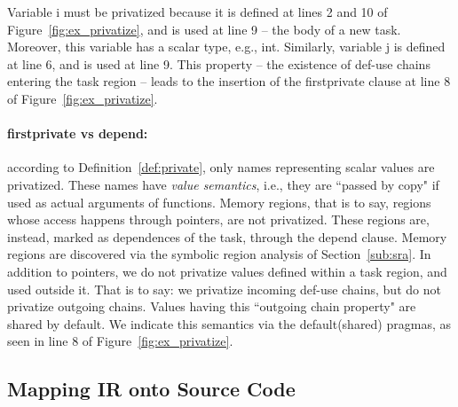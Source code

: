 \documentclass[sigplan,10pt,screen]{acmart}
\begin{document}
\begin{example}
\label{ex:priv_2}
Variable \textsf{i} must be privatized because it is defined at lines 2 and 10 of
Figure~\ref{fig:ex_privatize}, and is used at line 9 -- the body of a new task.
Moreover, this variable has a scalar type, e.g., \textsf{int}.
Similarly, variable \textsf{j} is defined at line 6, and is used at line 9.
This property -- the existence of def-use chains entering the task region --
leads to the insertion of the \textsf{firstprivate} clause at line 8 of
Figure~\ref{fig:ex_privatize}.
\end{example}

\noindent
\paragraph{firstprivate vs depend:} according to Definition~\ref{def:private},
only names representing scalar values are privatized.
These names have {\em value semantics}, i.e., they are ``passed
by copy" if used as actual arguments of functions.
Memory regions, that is to say, regions whose access happens through pointers,
are not privatized.
These regions are, instead, marked as dependences of the task, through the
\textsf{depend} clause.
Memory regions are discovered via the symbolic region analysis of
Section~\ref{sub:sra}.
In addition to pointers, we do not privatize values defined within
a task region, and used outside it.
That is to say: we privatize incoming def-use chains, but do not privatize
outgoing chains.
Values having this ``outgoing chain property" are shared by default.
We indicate this semantics via the \textsf{default(shared)} pragmas, as seen
in line 8 of Figure~\ref{fig:ex_privatize}.

\subsection{Mapping IR onto Source Code}
\label{sub:ir}
\end{document}
